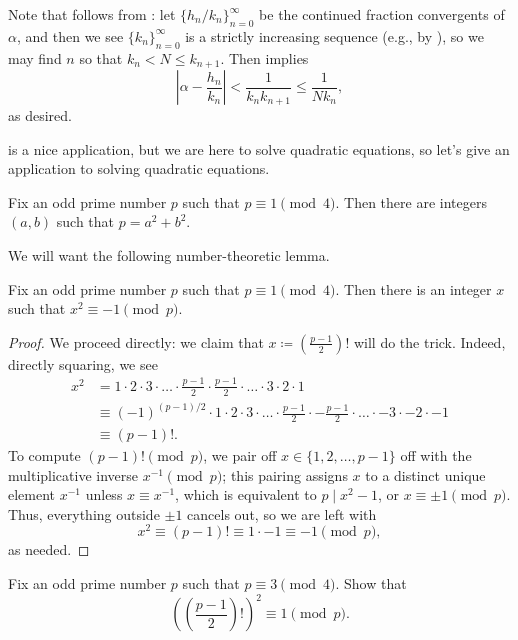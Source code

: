\documentclass[../notes.tex]{subfiles}
\begin{document}
\begin{remark} \label{rem:dirichlet-approx-by-cf}
	Note that  follows from : let $\{h_n/k_n\}_{n=0}^\infty$ be the continued fraction convergents of $\alpha$, and then we see $\{k_n\}_{n=0}^\infty$ is a strictly increasing sequence (e.g., by ), so we may find $n$ so that $k_n<N\le k_{n+1}$. Then  implies
	\[\left|\alpha-\frac{h_n}{k_n}\right|<\frac1{k_nk_{n+1}}\le\frac1{Nk_n},\]
	as desired.
\end{remark}
 is a nice application, but we are here to solve quadratic equations, so let's give an application to solving quadratic equations.
\begin{proposition} \label{prop:1-mod-4-primes}
	Fix an odd prime number $p$ such that $p\equiv1\pmod4$. Then there are integers $(a,b)$ such that $p=a^2+b^2$.
\end{proposition}
We will want the following number-theoretic lemma.
\begin{lemma} \label{lem:minus-1-is-square}
	Fix an odd prime number $p$ such that $p\equiv1\pmod4$. Then there is an integer $x$ such that $x^2\equiv-1\pmod p$.
\end{lemma}
\begin{proof}
	We proceed directly: we claim that $x\coloneqq\left(\frac{p-1}2\right)!$ will do the trick. Indeed, directly squaring, we see
	\begin{align*}
		x^2 &= 1\cdot2\cdot3\cdot\ldots\cdot\frac{p-1}2\cdot\frac{p-1}2\cdot\ldots\cdot3\cdot2\cdot1 \\
		&\equiv (-1)^{(p-1)/2}\cdot1\cdot2\cdot3\cdot\ldots\cdot\frac{p-1}2\cdot-\frac{p-1}2\cdot\ldots\cdot-3\cdot-2\cdot-1 \\
		&\equiv (p-1)!.
	\end{align*}
	To compute $(p-1)!\pmod p$, we pair off $x\in\{1,2,\ldots,p-1\}$ off with the multiplicative inverse $x^{-1}\pmod p$; this pairing assigns $x$ to a distinct unique element $x^{-1}$ unless $x\equiv x^{-1}$, which is equivalent to $p\mid x^2-1$, or $x\equiv\pm1\pmod p$. Thus, everything outside $\pm1$ cancels out, so we are left with
	\[x^2\equiv(p-1)!\equiv1\cdot-1\equiv-1\pmod p,\]
	as needed.
\end{proof}
\begin{exe}
	Fix an odd prime number $p$ such that $p\equiv3\pmod4$. Show that
	\[\left(\left(\frac{p-1}2\right)!\right)^2\equiv1\pmod p.\]
\end{exe}
\end{document}
